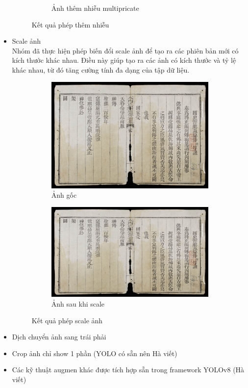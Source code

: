 \documentclass[a4paper,12pt]{article}
\begin{document}
\begin{itemize}
\begin{figure}[H]
\begin{subfigure}{.4\textwidth}
          \caption{Ảnh thêm nhiễu multipricate}
        \end{subfigure}
        \caption{Kết quả phép thêm nhiễu}
    \end{figure}
    \item Scale ảnh
    \\Nhóm đã thực hiện phép biến đổi scale ảnh để tạo ra các phiên bản mới có kích thước khác nhau. Điều này giúp tạo ra các ảnh có kích thước và tỷ lệ khác nhau, từ đó tăng cường tính đa dạng của tập dữ liệu.
    \begin{figure}[H]
        \centering
        \begin{subfigure}{.4\textwidth}
          \includegraphics[width=1\linewidth]{images/original_img_1.jpg}
          \caption{Ảnh gốc}
        \end{subfigure}
        \hspace{20mm}
        \begin{subfigure}{.4\textwidth}
          \includegraphics[width=1\linewidth]{images/scaled_img.png}
          \caption{Ảnh sau khi scale}
        \end{subfigure}
        \caption{Kết quả phép scale ảnh}
    \end{figure}
    \item Dịch chuyển ảnh sang trái phải
    \item Crop ảnh chỉ show 1 phần (YOLO có sẵn nên Hà viết)
    \item Các kỹ thuật augmen khác được tích hợp sẵn trong framework YOLOv8 (Hà viết)
\end{itemize}
\end{document}
